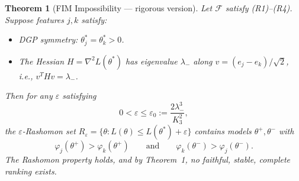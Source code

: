 \documentclass{article}
\newtheorem{theorem}{Theorem}
\begin{document}
\begin{theorem}[FIM Impossibility --- rigorous version]
\label{thm:fim-impossibility}
Let $\mathcal{F}$ satisfy (R1)--(R4). Suppose features $j, k$
satisfy:
\begin{itemize}
    \item[\textbf{(S1)}] DGP symmetry: $\theta^*_j = \theta^*_k > 0$.
    \item[\textbf{(S2)}] The Hessian $H = \nabla^2 L(\theta^*)$ has
      eigenvalue $\lambda_-$ along $v = (e_j - e_k)/\sqrt{2}$,
      i.e., $v^T H v = \lambda_-$.
\end{itemize}

Then for any $\varepsilon$ satisfying
\begin{equation}
\label{eq:epsilon-bound}
    0 < \varepsilon \leq \varepsilon_0 :=
    \frac{2\lambda_-^3}{K_3^2},
\end{equation}
the $\varepsilon$-Rashomon set
$R_\varepsilon = \{\theta : L(\theta) \leq L(\theta^*) + \varepsilon\}$
contains models $\theta^+, \theta^-$ with
\[
    \varphi_j(\theta^+) > \varphi_k(\theta^+)
    \qquad\text{and}\qquad
    \varphi_k(\theta^-) > \varphi_j(\theta^-).
\]
The Rashomon property holds, and by Theorem~1,
no faithful, stable, complete ranking exists.
\end{theorem}
\end{document}
